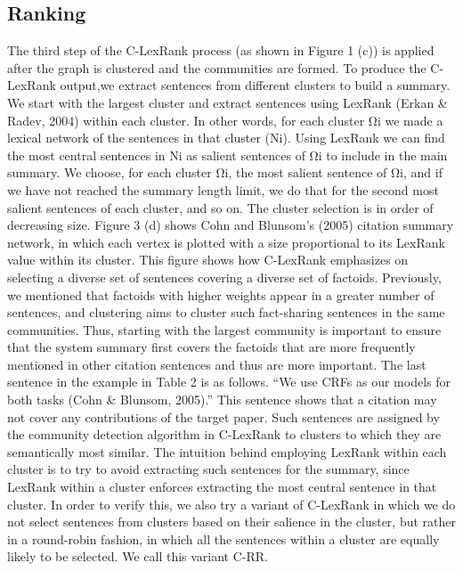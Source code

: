 \subsection{Ranking}

The third step of the C-LexRank process (as shown in Figure 1 (c)) is applied after the
graph is clustered and the communities are formed. To produce the C-LexRank output,we extract sentences from different clusters to build a summary. We start with the largest
cluster and extract sentences using LexRank (Erkan \& Radev, 2004) within each cluster. In
other words, for each cluster Ωi we made a lexical network of the sentences in that cluster
(Ni). Using LexRank we can find the most central sentences in Ni as salient sentences of Ωi
to include in the main summary. We choose, for each cluster Ωi, the most salient sentence
of Ωi, and if we have not reached the summary length limit, we do that for the second most
salient sentences of each cluster, and so on. The cluster selection is in order of decreasing
size. Figure 3 (d) shows Cohn and Blunsom’s (2005) citation summary network, in which
each vertex is plotted with a size proportional to its LexRank value within its cluster. This
figure shows how C-LexRank emphasizes on selecting a diverse set of sentences covering a
diverse set of factoids.
Previously, we mentioned that factoids with higher weights appear in a greater number
of sentences, and clustering aims to cluster such fact-sharing sentences in the same communities.
Thus, starting with the largest community is important to ensure that the system
summary first covers the factoids that are more frequently mentioned in other citation
sentences and thus are more important.
The last sentence in the example in Table 2 is as follows. “We use CRFs as our models
for both tasks (Cohn \& Blunsom, 2005).” This sentence shows that a citation may not
cover any contributions of the target paper. Such sentences are assigned by the community
detection algorithm in C-LexRank to clusters to which they are semantically most similar.
The intuition behind employing LexRank within each cluster is to try to avoid extracting
such sentences for the summary, since LexRank within a cluster enforces extracting the most
central sentence in that cluster. In order to verify this, we also try a variant of C-LexRank
in which we do not select sentences from clusters based on their salience in the cluster, but
rather in a round-robin fashion, in which all the sentences within a cluster are equally likely
to be selected. We call this variant C-RR.

